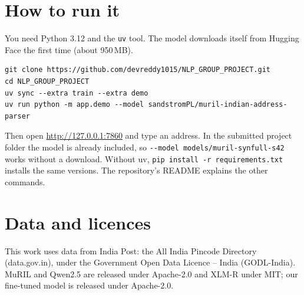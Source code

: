 \documentclass[11pt,a4paper]{article}
\newcommand{\code}[1]{\texttt{#1}}
\begin{document}
\section{How to run it}
You need Python 3.12 and the \code{uv} tool. The model downloads itself from Hugging Face the first time (about
950\,MB).
\begin{lstlisting}
git clone https://github.com/devreddy1015/NLP_GROUP_PROJECT.git
cd NLP_GROUP_PROJECT
uv sync --extra train --extra demo
uv run python -m app.demo --model sandstromPL/muril-indian-address-parser
\end{lstlisting}
Then open \url{http://127.0.0.1:7860} and type an address. In the submitted project folder the model is already
included, so \code{-{}-model models/muril-synfull-s42} works without a download. Without uv,
\code{pip install -r requirements.txt} installs the same versions. The repository's README explains the other
commands.

\section*{Data and licences}
This work uses data from India Post: the All India Pincode Directory (data.gov.in), under the Government Open Data
Licence -- India (GODL-India). MuRIL and Qwen2.5 are released under Apache-2.0 and \mbox{XLM-R} under MIT; our fine-tuned
model is released under Apache-2.0.

\appendix
\end{document}
